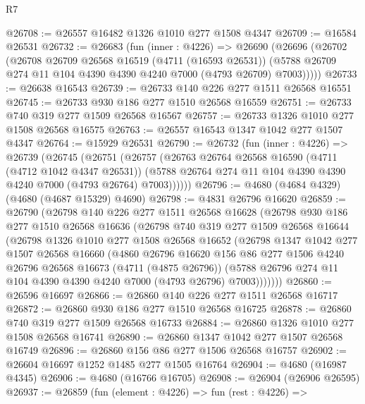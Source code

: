 \begin{lexlean}{R7}
\begin{coremodule}
@26708 := @26557 @16482 @1326 @1010 @277 @1508 @4347
@26709 := @16584 @26531
@26732 := @26683
    (fun (inner : @4226) =>
    @26690
      (@26696
        (@26702
          (@26708
            @26709
            @26568
            @16519
            (@4711 (@16593 @26531))
            (@5788 @26709 @274 @11 @104 @4390 @4390 @4240 @7000 (@4793 @26709) @7003)))))
@26733 := @26638 @16543
@26739 := @26733 @140 @226 @277 @1511 @26568 @16551
@26745 := @26733 @930 @186 @277 @1510 @26568 @16559
@26751 := @26733 @740 @319 @277 @1509 @26568 @16567
@26757 := @26733 @1326 @1010 @277 @1508 @26568 @16575
@26763 := @26557 @16543 @1347 @1042 @277 @1507 @4347
@26764 := @15929 @26531
@26790 := @26732
    (fun (inner : @4226) =>
    @26739
      (@26745
        (@26751
          (@26757
            (@26763
              @26764
              @26568
              @16590
              (@4711 (@4712 @1042 @4347 @26531))
              (@5788 @26764 @274 @11 @104 @4390 @4390 @4240 @7000 (@4793 @26764) @7003))))))
@26796 := @4680 (@4684 @4329) (@4680 (@4687 @15329) @4690)
@26798 := @4831 @26796 @16620
@26859 := @26790
    (@26798
      @140
      @226
      @277
      @1511
      @26568
      @16628
      (@26798
        @930
        @186
        @277
        @1510
        @26568
        @16636
        (@26798
          @740
          @319
          @277
          @1509
          @26568
          @16644
          (@26798
            @1326
            @1010
            @277
            @1508
            @26568
            @16652
            (@26798
              @1347
              @1042
              @277
              @1507
              @26568
              @16660
              (@4860
                @26796
                @16620
                @156
                @86
                @277
                @1506
                @4240
                @26796
                @26568
                @16673
                (@4711 (@4875 @26796))
                (@5788 @26796 @274 @11 @104 @4390 @4390 @4240 @7000 (@4793 @26796) @7003)))))))
@26860 := @26596 @16697
@26866 := @26860 @140 @226 @277 @1511 @26568 @16717
@26872 := @26860 @930 @186 @277 @1510 @26568 @16725
@26878 := @26860 @740 @319 @277 @1509 @26568 @16733
@26884 := @26860 @1326 @1010 @277 @1508 @26568 @16741
@26890 := @26860 @1347 @1042 @277 @1507 @26568 @16749
@26896 := @26860 @156 @86 @277 @1506 @26568 @16757
@26902 := @26604 @16697 @1252 @1485 @277 @1505 @16764
@26904 := @4680 (@16987 @4345)
@26906 := @4680 (@16766 @16705)
@26908 := @26904 (@26906 @26595)
@26937 := @26859
    (fun (element : @4226) =>
    fun (rest : @4226) =>

\end{coremodule}
\end{lexlean}
